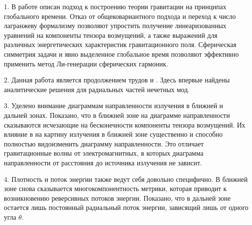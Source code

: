 \documentclass[\docroot/reports/draft/report.tex]{subfiles}
\begin{document}
\onlyinsubfile{\tableofcontents}

1. В работе описан подход к построению теории гравитации на принципах глобального времени. Отказ от общековариантного подхода и переход к число лагранжеву формализму позволяют упростить получение линеаризованных уравнений на компоненты тензора возмущений, а также выражений для различных энергетических характеристик гравитационного поля. Сферическая симметрия задачи и явно выделенное глобальное время позволяют эффективно применить метод Ли-генерации сферических гармоник.

2. Данная работа является продолжением трудов \cite{burlankov_space_dynamics} и \cite{burlankov_grav_waves}. Здесь впервые найдены аналитические решения для радиальных частей нечетных мод.

3. Уделено внимание диаграммам направленности излучения в ближней и дальней зонах. Показано, что в ближней зоне на диаграмме направленности сказываются исчезающие на бесконечности компоненты тензора возмущений. Их влияние в на картину излучения в ближней зоне существенно и способно полностью видоизменить диаграмму направленности. Это отличает гравитационные волны от электромагнитных, в которых диаграмма направленности от расстояния до источника излучения не зависит.

4. Плотность и поток энергии также ведут себя довольно специфично. В ближней зоне снова сказывается многокомпонентность метрики, которая приводит к возникновению реверсивных потоков энергии. Показано, что в дальней зоне остается лишь постоянный радиальный поток энергии, зависящий лишь от одного угла $\theta$.

\end{document}
